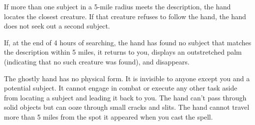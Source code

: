 If more than one subject in a 5-mile radius meets the description, the hand locates 
the closest creature. If that creature refuses to follow the hand, the hand does 
not seek out a second subject.

If, at the end of 4 hours of searching, the hand has found no subject that matches 
the description within 5 miles, it returns to you, displays an outstretched palm 
(indicating that no such creature was found), and disappears.

The ghostly hand has no physical form. It is invisible to anyone except you and 
a potential subject. It cannot engage in combat or execute any other task aside 
from locating a subject and leading it back to you. The hand can't pass through 
solid objects but can ooze through small cracks and slits. The hand cannot travel 
more than 5 miles from the spot it appeared when you cast the spell.

